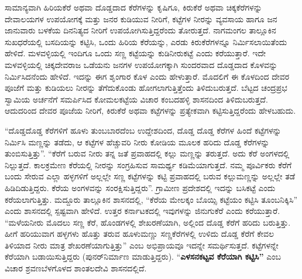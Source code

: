 ಸಾಮಾನ್ಯವಾಗಿ ಹಿರಿಯಕೆರೆ ಅಥವಾ ದೊಡ್ಡದಾದ ಕೆರೆಗಳನ್ನು ಕೃಷಿಗೂ, ಕಿರುಕೆರೆ ಅಥವಾ ಚಿಕ್ಕಕೆರೆಗಳನ್ನು ದೇವಾಲಯಗಳ ಉಪಯೋಗಕ್ಕೆ ಮತ್ತು ಜನರ ಕುಡಿಯುವ ನೀರಿಗೆ, ಕಟ್ಟೆಗಳ ನೀರನ್ನು ವ್ಯವಸಾಯ ಹಾಗೂ ಜನ ಜಾನುವಾರು ಬಳಕೆಯ ದಿನನಿತ್ಯದ ನೀರಿಗೆ ಉಪಯೋಗಿಸುತ್ತಿದ್ದರೆಂದು ತೋರುತ್ತದೆ. ನಾಗಮಂಗಲ ತಾಲ್ಲೂಕಿನ ಸುಖಧರೆಯಲ್ಲಿ ಬಸದಿಯನ್ನು ಕಟ್ಟಿಸಿ, ಒಂದು ಹಿರಿಯ ಕೆರೆಯನ್ನು, ಎರಡು ಕಿರುಕೆರೆಗಳನ್ನೂ ನಿರ್ಮಿಸಲಾಯಿತೆಂದು ಹೇಳಿದೆ. ಮಳವಳ್ಳಿಯಲ್ಲಿ ಇಂದಿಗೂ ಒಂದು ಸಣ್ಣ ಕಟ್ಟೆಯನ್ನು ಕುಡಿನೀರುಕಟ್ಟೆ ಎಂದು ಕರೆಯುತ್ತಾರೆ. ಇದೇ ಮಳವಳ್ಳಿಯಲ್ಲಿ ಚಿಕ್ಕದೇವರಾಜ ಒಡೆಯನು ಜನಗಳ ಉಪಯೋಗಕ್ಕಾಗಿ ಸುಂದರವಾದ ದೊಡ್ಡದಾದ ಕೊಳವನ್ನು ನಿರ್ಮಿಸಿದನೆಂದು ಹೇಳಿದೆ. ಇದನ್ನು ಈಗ ಶೃಂಗಾರ ಕೊಳ ಎಂದು ಹೇಳುತ್ತಾರೆ. ಮೊದಲಿಗೆ ಈ ಕೊಳದಿಂದ ದೇವರ ಪೂಜೆಗೆ ಮತ್ತು ಕುಡಿಯಲು ನೀರನ್ನು ತೆಗೆದುಕೊಂಡು ಹೋಗಲಾಗುತ್ತಿತ್ತೆಂದು ತಿಳಿದುಬರುತ್ತದೆ. ಬೆಟ್ಟದ ಚಂದ್ರಪ್ರಭ ಸ್ವಾಮಿಯ ಅರ್ಚನೆಗೆ ಸಮರ್ಪಿಸಿದ ಕೋಮಲಕಟ್ಟೆಯ ವಿಚಾರ ಕಂಬದಹಳ್ಳಿ ಶಾಸನದಿಂದ ತಿಳಿದುಬರುತ್ತದೆ. ಆದುದರಿಂದ ದೇವರ ಪೂಜೆಯ ನೀರಿಗೆ, ಕಿರುಕೆರೆ ಅಥವಾ ಕಟ್ಟೆಗಳನ್ನು ಪ್ರತ್ಯೇಕವಾಗಿ ಕಟ್ಟಿಸುತ್ತಿದ್ದರೆಂದು ಹೇಳಬಹುದು.

“ದೊಡ್ಡದೊಡ್ಡ ಕೆರೆಗಳಿಗೆ ಹೂಳು ತುಂಬಬಾರದೆಂಬ ಉದ್ದೇಶದಿಂದ, ದೊಡ್ಡ ದೊಡ್ಡ ಕೆರೆಗಳ ಹಿಂದೆ ಕಟ್ಟೆಗಳನ್ನು ನಿರ್ಮಿಸಿ ಮಣ್ಣನ್ನು ತಡೆದು, ಆ ಕಟ್ಟೆಗಳ ಹೆಚ್ಚುವರಿ ನೀರು ಕೋಡಿಯ ಮೂಲಕ ಹರಿದು ದೊಡ್ಡ ಕೆರೆಗಳನ್ನು ತುಂಬಿಸುತ್ತಿತ್ತು”. “ಕೆರೆಗೆ ಬರುವ ನೀರು ತನ್ನ ಜತೆ ಪ್ರವಾಹದಲ್ಲಿ ಕಲ್ಲು ಮಣ್ಣನ್ನು ತರುತ್ತದೆ. ಅದು ಕೆರೆ ಅಂಗಳದಲ್ಲಿ ನಿಲ್ಲುತ್ತದೆ. ಕಾಲಕ್ರಮೇಣ ಕೆರೆಯಲ್ಲಿ ನೀರನ್ನು ಸಂಗ್ರಹಿಸುವ ಸಾಮರ್ಥ್ಯ ಕಡಿಮೆಯಾಗುತ್ತದೆ. ನಮ್ಮ ಪೂರ್ವಿಕರು ಕೆರೆಗೆ ಬಂದು ಸೇರುವ ಎಲ್ಲಾ ಹಳ್ಳಗಳಿಗೆ ಅಲ್ಲಲ್ಲೇ ಸಣ್ಣ ಕಟ್ಟೆಗಳನ್ನು ಕಟ್ಟಿ ಪ್ರವಾಹದಲ್ಲಿ ಬರುವ ಕಲ್ಲುಮಣ್ಣನ್ನು ಅಲ್ಲಲ್ಲೇ ತಡೆ ಹಿಡಿದಿಡುತ್ತಿದ್ದರು. ಕೆರೆಯ ಅಂಗಳವನ್ನು ಸಂರಕ್ಷಿಸುತ್ತಿದ್ದರು”. ಗ್ರಾಮೀಣ ಪ್ರದೇಶದಲ್ಲಿ ಇದನ್ನು ಬಸಿಕಟ್ಟೆ ಎಂದು ಕರೆಯಲಾಗುತ್ತಿತ್ತು. ಮದ್ದೂರು ತಾಲ್ಲೂಕಿನ ಶಾಸನದಲ್ಲಿ, “ಕೆರೆಯ ಮೇಲಕ್ಕಂ ಬೊಯ್ಸಿ ಕಟ್ಟೆಯಂ ಕಟ್ಟಿಸಿ ತೂಂಬನಿಕ್ಕಿಸಿ” ಎಂದು ಶಾಸನದಲ್ಲಿ ಸ್ಪಷ್ಟವಾಗಿ ಹೇಳಿದೆ. ಉತ್ತರ ಕರ್ನಾಟಕದಲ್ಲಿ ಇವುಗಳನ್ನು ಜಿನುಗುಕೆರೆ ಎಂದು ಕರೆಯುತ್ತಾರೆ. “ಮಳೆಯನೀರು ಮೊದಲು ಸಣ್ಣ ಕೆರೆ, ಹೊಂಡಗಳಲ್ಲಿ ಶೇಖರಣೆಯಾಗಿ, ಅಲ್ಲಿಂದ ದೊಡ್ಡ ಕೆರೆಗೆ ಹರಿದು ಬರುತ್ತಿತ್ತು. ಹೀಗೆ ಹರಿಯುವಾಗ ಹಳ್ಳಗಳು ಹೊತ್ತು ತರುವ ಹೂಳುಮಣ್ಣು ಸಣ್ಣಕೆರೆಗಳಲ್ಲಿ ಉಳಿದು ದೊಡ್ಡ ಕೆರೆಗೆ ಕೇವಲ ತಿಳಿಯಾದ ನೀರು ಮಾತ್ರ ಶೇಖರಣೆಯಾಗುತ್ತಿತ್ತು” ಎಂಬ ಅಭಿಪ್ರಾಯವೂ ಇದನ್ನೇ ಸಮರ್ಥಿಸುತ್ತದೆ. ಕಟ್ಟೆಗಳನ್ನೇ ಕೆರೆಯಾಗಿ ಬಡಾಯಿಸುತ್ತಿದ್ದರು (ಪುನರ್​ನಿರ್ಮಾಣ ಮಾಡುತ್ತಿದ್ದರು). “\textbf{ಎಳಸನಕಟ್ಟವ ಕೆರೆಯಾಗಿ ಕಟ್ಟಿಸಿ”} ಎಂಬ ವಿಚಾರ ಶ್ರವಣಬೆಳಗೊಳದ ಶಾಂತಲದೇವಿ ಶಾಸನದಲ್ಲಿದೆ.



